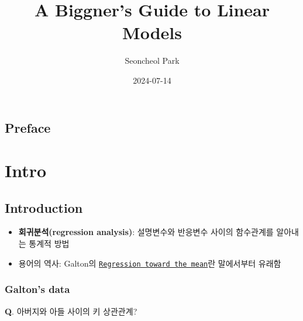 \documentclass[
  letterpaper,
  DIV=11,
  numbers=noendperiod]{scrreprt}
\title{A Biggner's Guide to Linear Models}
\author{Seoncheol Park}
\date{2024-07-14}
\newenvironment{Shaded}{\begin{snugshade}}{\end{snugshade}}
\newcommand{\AttributeTok}[1]{\textcolor[rgb]{0.40,0.45,0.13}{#1}}
\newcommand{\FunctionTok}[1]{\textcolor[rgb]{0.28,0.35,0.67}{#1}}
\newcommand{\NormalTok}[1]{\textcolor[rgb]{0.00,0.23,0.31}{#1}}
\newcommand{\OtherTok}[1]{\textcolor[rgb]{0.00,0.23,0.31}{#1}}
\newcommand{\SpecialCharTok}[1]{\textcolor[rgb]{0.37,0.37,0.37}{#1}}
\newcommand{\StringTok}[1]{\textcolor[rgb]{0.13,0.47,0.30}{#1}}
\renewcommand*\contentsname{Table of contents}
\newcommand\contentsname{Table of contents}
\theoremstyle{definition}
\theoremstyle{plain}
\theoremstyle{definition}
\theoremstyle{definition}
\theoremstyle{remark}
\begin{document}
\maketitle

\renewcommand{\Return}{\State \textbf{return}~}
\newcommand{\Print}{\State \textbf{print}~}
\newcommand{\Break}{\State \textbf{break}}
\newcommand{\Continue}{\State \textbf{continue}}
\newcommand{\True}{\textbf{true}}
\newcommand{\False}{\textbf{false}}
\renewcommand{\And}{\textbf{and}~}
\newcommand{\Or}{\textbf{or}~}
\renewcommand{\Not}{\textbf{not}~}
\newcommand{\To}{\textbf{to}~}
\newcommand{\DownTo}{\textbf{downto}~}


\renewcommand*\contentsname{Table of contents}
{
\hypersetup{linkcolor=}
\setcounter{tocdepth}{2}
\tableofcontents
}

\chapter*{Preface}\label{preface}


\part{Intro}

\chapter{Introduction}\label{introduction}

\begin{itemize}
\item
  \textbf{회귀분석(regression analysis)}: 설명변수와 반응변수 사이의
  함수관계를 알아내는 통계적 방법
\item
  용어의 역사: Galton의
  \href{https://en.wikipedia.org/wiki/Regression_toward_the_mean}{\texttt{Regression\ toward\ the\ mean}}란
  말에서부터 유래함
\end{itemize}

\section{Galton's data}\label{galtons-data}

\textbf{Q}. 아버지와 아들 사이의 키 상관관계?

\begin{Shaded}
\end{Shaded}
\end{document}
